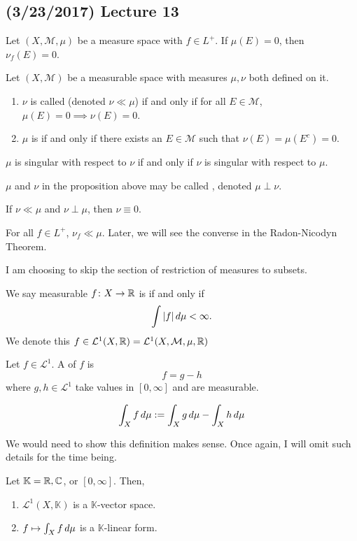 \documentclass[11pt,leqno,oneside]{amsbook}
\numberwithin{thm}{section}
\newcommand{\M}{\mathcal{M}}
\newcommand{\cL}{\mathcal{L}}
\begin{document}
\subsection*{(3/23/2017) Lecture 13}
\begin{prop}
  Let \((X,\M,\mu)\) be a measure space with \(f \in L^+\). If
  \(\mu(E) = 0\), then \(\nu_f(E) = 0\).
\end{prop}
\begin{defn}
  Let \((X,\M)\) be a measurable space with measures \(\mu,\nu\) both
  defined on it.
  \begin{enumerate}
  \item \(\nu\) is called  (denoted \(\nu \ll \mu\)) if and only if for all \(E
    \in \M\), \(\mu(E) = 0 \implies \nu(E) = 0\).
  \item \(\mu\) is  if and only
    if there exists an \(E \in \M\) such that \(\nu(E) = \mu(E^c) =
    0\).
  \end{enumerate}
\end{defn}
\begin{prop}
  \(\mu\) is singular with respect to \(\nu\) if and only if \(\nu\)
  is singular with respect to \(\mu\).
\end{prop}
\begin{defn}
  \(\mu\) and \(\nu\) in the proposition above may be called
  , denoted \(\mu \perp \nu\).
\end{defn}
\begin{rmk}
  If \(\nu \ll \mu\) and \(\nu \perp \mu\), then \(\nu \equiv 0\).
\end{rmk}
\begin{rmk}
  For all \(f \in L^+\), \(\nu_f \ll \mu\). Later, we will see the
  converse in the Radon-Nicodyn Theorem.
\end{rmk}
I am choosing to skip the section of restriction of measures to
subsets.
\begin{defn}
  We say measurable \(f \colon X \to {\mathbb R}\) is  if and only if \[
    \int |f| \, d\mu < \infty.
  \]
  We denote this \(f \in \cL^1(X,\R) = \cL^1(X,\M,\mu,\R)\)
\end{defn}
\begin{defn}
  Let \(f \in \cL^1\). A  of \(f\) is \[
    f = g-h
  \]
  where \(g,h \in \cL^1\) take values in \([0,\infty]\) and are
  measurable.
\end{defn}
\begin{defn}
  \[
    \int_X f \, d\mu := \int_X g \, d\mu - \int_X h \, d\mu
  \]
\end{defn}
We would need to show this definition makes sense. Once again, I will
omit such details for the time being.
\begin{prop}
  Let \(\mathbb{K} = {\mathbb R},{\mathbb C}\), or \([0,\infty]\). Then,
  \begin{enumerate}
  \item \(\cL^1(X,\mathbb{K})\) is a \(\mathbb{K}\)-vector space.
  \item \(f \mapsto \int_X f \, d\mu\) is a \(\mathbb{K}\)-linear form.
  \end{enumerate}
\end{prop}
\end{document}
